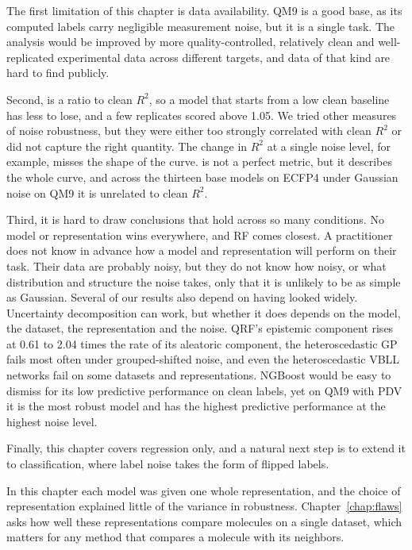 The first limitation of this chapter is data availability. QM9 is a good base, as its computed labels carry negligible measurement noise, but it is a single task. The analysis would be improved by more quality-controlled, relatively clean and well-replicated experimental data across different targets, and data of that kind are hard to find publicly.

Second, \aucnorm{} is a ratio to clean $R^2$, so a model that starts from a low clean baseline has less to lose, and a few replicates scored above 1.05. We tried other measures of noise robustness, but they were either too strongly correlated with clean $R^2$ or did not capture the right quantity. The change in $R^2$ at a single noise level, for example, misses the shape of the curve. \aucnorm{} is not a perfect metric, but it describes the whole curve, and across the thirteen base models on ECFP4 under Gaussian noise on QM9 it is unrelated to clean $R^2$.

Third, it is hard to draw conclusions that hold across so many conditions. No model or representation wins everywhere, and RF comes closest. A practitioner does not know in advance how a model and representation will perform on their task. Their data are probably noisy, but they do not know how noisy, or what distribution and structure the noise takes, only that it is unlikely to be as simple as Gaussian. Several of our results also depend on having looked widely. Uncertainty decomposition can work, but whether it does depends on the model, the dataset, the representation and the noise. QRF's epistemic component rises at 0.61 to 2.04 times the rate of its aleatoric component, the heteroscedastic GP fails most often under grouped-shifted noise, and even the heteroscedastic VBLL networks fail on some datasets and representations. NGBoost would be easy to dismiss for its low predictive performance on clean labels, yet on QM9 with PDV it is the most robust model and has the highest predictive performance at the highest noise level.

Finally, this chapter covers regression only, and a natural next step is to extend it to classification, where label noise takes the form of flipped labels.

In this chapter each model was given one whole representation, and the choice of representation explained little of the variance in robustness. Chapter~\ref{chap:flaws} asks how well these representations compare molecules on a single dataset, which matters for any method that compares a molecule with its neighbors.
